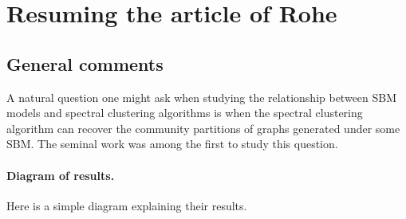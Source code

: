 \documentclass[../../main.tex]{subfiles} %
\begin{document}
\section{Resuming the article of Rohe}

\subsection{General comments}
A natural question one might ask when studying the relationship 
between SBM models and spectral clustering algorithms is when the spectral 
clustering algorithm can recover the community partitions of graphs generated 
under some SBM. The seminal work \cite{rohe_spectral_2011} was among the first 
to study this question. 

\paragraph{Diagram of results.} Here is a simple diagram explaining their 
results.
\end{document}
